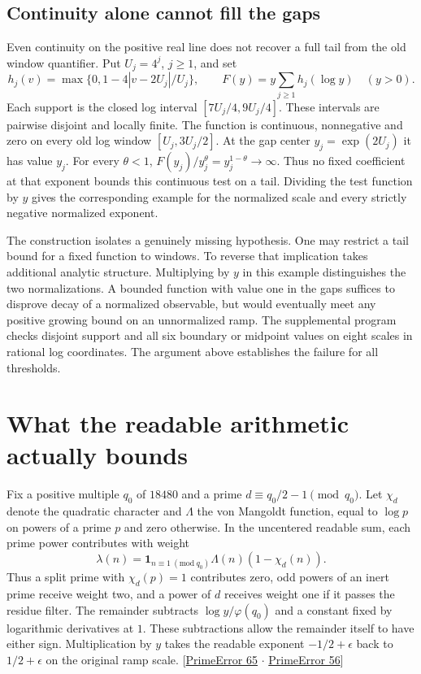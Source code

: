 \documentclass[12pt,letterpaper]{article}
\begin{document}
\subsection{Continuity alone cannot fill the gaps}
Even continuity on the positive real line does not recover a full tail from the old window quantifier. Put $U_j=4^j$, $j\ge1$, and set
\[
 h_j(v)=\max\{0,1-4|v-2U_j|/U_j\},\qquad
 F(y)=y\sum_{j\ge1}h_j(\log y)\quad(y>0).
\]
Each support is the closed log interval $[7U_j/4,9U_j/4]$. These intervals are pairwise disjoint and locally finite. The function is continuous, nonnegative and zero on every old log window $[U_j,3U_j/2]$. At the gap center $y_j=\exp(2U_j)$ it has value $y_j$. For every $\theta<1$, $F(y_j)/y_j^\theta=y_j^{1-\theta}\to\infty$. Thus no fixed coefficient at that exponent bounds this continuous test on a tail. Dividing the test function by $y$ gives the corresponding example for the normalized scale and every strictly negative normalized exponent.

The construction isolates a genuinely missing hypothesis. One may restrict a tail bound for a fixed function to windows. To reverse that implication takes additional analytic structure. Multiplying by $y$ in this example distinguishes the two normalizations. A bounded function with value one in the gaps suffices to disprove decay of a normalized observable, but would eventually meet any positive growing bound on an unnormalized ramp. The supplemental program checks disjoint support and all six boundary or midpoint values on eight scales in rational log coordinates. The argument above establishes the failure for all thresholds.


\section{What the readable arithmetic actually bounds}
Fix a positive multiple $q_0$ of $18480$ and a prime $d\equiv q_0/2-1\pmod {q_0}$. Let $\chi_d$ denote the quadratic character and $\Lambda$ the von Mangoldt function, equal to $\log p$ on powers of a prime $p$ and zero otherwise. In the uncentered readable sum, each prime power contributes with weight
\[
 \lambda(n)=\mathbf1_{n\equiv1\ (\mathrm{mod}\ q_0)}\Lambda(n)(1-\chi_d(n)).
\]
Thus a split prime with $\chi_d(p)=1$ contributes zero, odd powers of an inert prime receive weight two, and a power of $d$ receives weight one if it passes the residue filter. The remainder subtracts $\log y/\varphi(q_0)$ and a constant fixed by logarithmic derivatives at $1$. These subtractions allow the remainder itself to have either sign. Multiplication by $y$ takes the readable exponent $-1/2+\epsilon$ back to $1/2+\epsilon$ on the original ramp scale. {\small\sffamily\color{mute}[\href{https://github.com/leanprover-community/riemann-hypothesis/blob/e063a923620ee7787b4a1270421478645bf66bdb/src/New/Reduction/Zeros/PrimeError.lean#L65}{PrimeError 65} $\cdot$ \href{https://github.com/leanprover-community/riemann-hypothesis/blob/e063a923620ee7787b4a1270421478645bf66bdb/src/New/Reduction/Zeros/PrimeError.lean#L56}{PrimeError 56}]}
\end{document}
